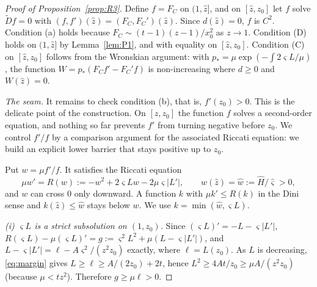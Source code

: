 \documentclass[11pt]{amsart}
\theoremstyle{definition}
\theoremstyle{remark}
\numberwithin{equation}{section}
\begin{document}
\begin{proof}[Proof of Proposition~\ref{prop:R3}]
Define $f=F_C$ on $(1,\hat z]$, and on $[\hat z,z_0]$ let $f$ solve $\widetilde Df=0$ with
$(f,f')(\hat z)=(F_C,F_C')(\hat z)$. Since $d(\hat z)=0$, $f$ is $C^2$. Condition (a) holds because
$F_C\sim(t-1)(z-1)/x_0^2$ as $z\to1$. Condition (D) holds on $(1,\hat z]$ by Lemma~\ref{lem:P1}, and with equality
on $[\hat z,z_0]$. Condition (C) on $[\hat z,z_0]$ follows from the Wronskian argument: with
$p_*=\mu\exp(-\int2\varsigma L/\mu)$, the function $W=p_*(F_Cf'-F_C'f)$ is non-increasing where $d\ge0$ and $W(\hat z)=0$.

\emph{The seam.} It remains to check condition (b), that is, $f'(z_0)>0$. This is the delicate point of the
construction. On $[\hat z,z_0]$ the function $f$ solves a second-order equation, and nothing so far prevents $f'$
from turning negative before $z_0$. We control $f'/f$ by a comparison argument for the associated Riccati equation:
we build an explicit lower barrier that stays positive up to $z_0$.

Put $w=\mu f'/f$. It satisfies the Riccati equation
\begin{equation}\label{eq:riccati}
\mu w'=R(w):=-w^2+2\varsigma Lw-2\mu \varsigma|L'|,\qquad w(\hat z)=\hat w:=\hat H/\hat \varsigma>0,
\end{equation}
and $w$ can cross $0$ only downward. A function $k$ with $\mu k'\le R(k)$ in the Dini sense and $k(\hat z)\le\hat w$
stays below $w$. We use $k=\min(\hat w,\varsigma L)$.

\emph{(i) $\varsigma L$ is a strict subsolution on $(1,z_0)$.} Since $(\varsigma L)'=-L-\varsigma|L'|$,
$R(\varsigma L)-\mu(\varsigma L)'=g:=\varsigma^2L^2+\mu(L-\varsigma|L'|)$, and $L-\varsigma|L'|=\ell-A\varsigma^2/(z^2z_0)$ exactly, where $\ell=L(z_0)$. As $L$ is
decreasing, \eqref{eq:margin} gives $L\ge\ell\ge A/(2z_0)+2t$, hence $L^2\ge4At/z_0\ge\mu A/(z^2z_0)$ (because
$\mu<tz^2$). Therefore $g\ge\mu\ell>0$.


\end{proof}
\end{document}
